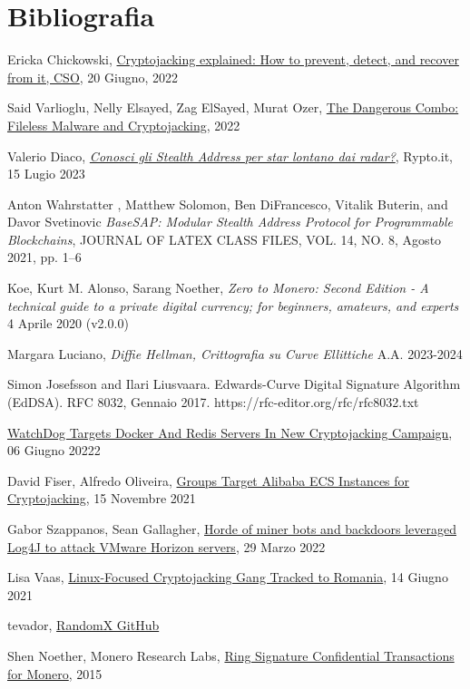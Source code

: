 \documentclass[12pt,a4paper]{article}
\begin{document}
\section{Bibliografia}
\begin{thebibliography}{9}

Ericka Chickowski, \href{https://arc.net/l/quote/karbftmg}{Cryptojacking
explained: How to prevent, detect, and recover from it, CSO}, 20 Giugno, 2022

Said Varlioglu, Nelly Elsayed, Zag ElSayed, Murat Ozer,
\href{https://arc.net/l/quote/kbarlqni}{The Dangerous Combo: Fileless Malware
and Cryptojacking}, 2022

Valerio Diaco, \href{https://arc.net/l/quote/qirrmtbh}{\textit{Conosci gli
Stealth Address per star lontano dai radar?}}, Rypto.it, 15 Lugio 2023

Anton Wahrstatter , Matthew Solomon, Ben DiFrancesco, Vitalik Buterin, and Davor
Svetinovic \textit{BaseSAP: Modular Stealth Address Protocol for Programmable
Blockchains}, JOURNAL OF LATEX CLASS FILES, VOL. 14, NO. 8, Agosto 2021, pp. 1–6

Koe, Kurt M. Alonso, Sarang Noether, \textit{Zero to Monero: Second Edition - A
technical guide to a private digital currency; for beginners, amateurs, and
experts} 4 Aprile 2020 (v2.0.0)

Margara Luciano, \textit{Diffie Hellman, Crittografia su Curve Ellittiche} A.A.
2023-2024

Simon Josefsson and Ilari Liusvaara. Edwards-Curve Digital Signature Algorithm
(EdDSA). RFC 8032, Gennaio 2017. https://rfc-editor.org/rfc/rfc8032.txt

\href{https://cyware.com/news/watchdog-targets-docker-and-redis-servers-in-new-cryptojacking-campaign-a5681a92}{WatchDog
Targets Docker And Redis Servers In New Cryptojacking Campaign}, 06 Giugno 20222

David Fiser, Alfredo Oliveira,
\href{https://www.trendmicro.com/en_us/research/21/k/groups-target-alibaba-ecs-instances-for-cryptojacking.html}{Groups
Target Alibaba ECS Instances for Cryptojacking}, 15 Novembre 2021

Gabor Szappanos, Sean Gallagher,
\href{https://news.sophos.com/en-us/2022/03/29/horde-of-miner-bots-and-backdoors-leveraged-log4j-to-attack-vmware-horizon-servers/}{Horde
of miner bots and backdoors leveraged Log4J to attack VMware Horizon servers},
29 Marzo 2022

Lisa Vaas,
\href{https://threatpost.com/linux-cryptojacking-gang-romania/167783/}{Linux-Focused
Cryptojacking Gang Tracked to Romania}, 14 Giugno 2021

tevador, \href{https://github.com/tevador/RandomX}{RandomX GitHub}

Shen Noether, Monero Research Labs, \href{https://eprint.iacr.org/2015/1098}{Ring Signature Confidential Transactions for Monero}, 2015

\end{thebibliography}
\end{document}

